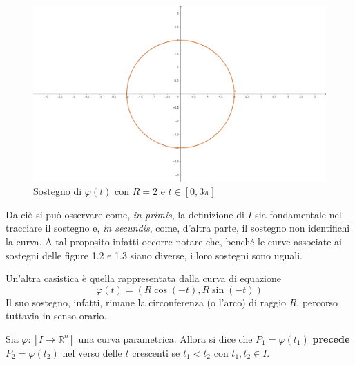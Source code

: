 \begin{example}
\begin{figure}[H]
\begin{minipage}{0.25\textwidth}
        \includegraphics[width=\textwidth]{Capitoli/Capitolo1/sostegno_circ3.png}
        \caption{Sostegno di $\varphi(t)$ con $R=2$ e $t\in[0, 3\pi]$}
    \end{minipage}
\end{figure}
\end{example}
Da ciò si può osservare come, \textit{in primis}, la definizione di $I$ sia fondamentale nel tracciare il sostegno e, \textit{in secundis}, come, d'altra parte, il sostegno non identifichi la curva. A tal proposito infatti occorre notare che, benché le curve associate ai sostegni delle figure 1.2 e 1.3 siano diverse, i loro sostegni sono uguali.
\begin{example}    
    Un'altra casistica è quella rappresentata dalla curva di equazione
    \begin{equation*}    
    \varphi(t)=(R \cos(-t), R \sin(-t)) 
    \end{equation*}
    Il suo sostegno, infatti, rimane la circonferenza (o l'arco) di raggio $R$, percorso tuttavia in senso orario.
\end{example}
\begin{definition}
    Sia $\varphi:[I \to \mathbb{R}^n]$ una curva parametrica. Allora si dice che $P_1=\varphi(t_1)$ \textbf{precede} $P_2=\varphi(t_2)$ nel verso delle $t$ crescenti se $t_1<t_2$ con $t_1, t_2 \in I$.
\end{definition}
